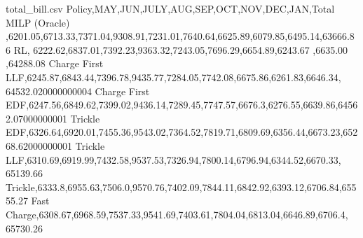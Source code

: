 
\begin{filecontents}{total_bill.csv}
Policy,MAY,JUN,JULY,AUG,SEP,OCT,NOV,DEC,JAN,Total
MILP (Oracle) ,6201.05,6713.33,7371.04,9308.91,7231.01,7640.64,6625.89,6079.85,6495.14,63666.86
RL,  6222.62,6837.01,7392.23,9363.32,7243.05,7696.29,6654.89,6243.67 ,6635.00 ,64288.08
Charge First LLF,6245.87,6843.44,7396.78,9435.77,7284.05,7742.08,6675.86,6261.83,6646.34, 64532.020000000004 
Charge First EDF,6247.56,6849.62,7399.02,9436.14,7289.45,7747.57,6676.3,6276.55,6639.86,64562.07000000001
Trickle EDF,6326.64,6920.01,7455.36,9543.02,7364.52,7819.71,6809.69,6356.44,6673.23,65268.62000000001
Trickle LLF,6310.69,6919.99,7432.58,9537.53,7326.94,7800.14,6796.94,6344.52,6670.33, 65139.66
Trickle,6333.8,6955.63,7506.0,9570.76,7402.09,7844.11,6842.92,6393.12,6706.84,65555.27
Fast Charge,6308.67,6968.59,7537.33,9541.69,7403.61,7804.04,6813.04,6646.89,6706.4, 65730.26
\end{filecontents}


